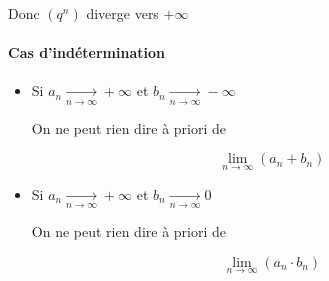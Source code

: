 \documentclass[
    11pt,
    a4paper,
    oneside,
    headinlcude, footinclude,
    twoside,
]{report}
\begin{document}
Donc $(q^{n})$ diverge vers $+ \infty$

\paragraph{Cas d'indétermination}

\begin{itemize}
\item Si $a_{n} \xrightarrow[n \to \infty]{} + \infty$ et $b_{n}
\xrightarrow[n \to \infty]{} - \infty$

On ne peut rien dire à priori de 

$$ \lim_{n \to \infty} (a_{n} + b_{n})$$

\item Si  $a_{n} \xrightarrow[n \to \infty]{} + \infty$ et $b_{n}
\xrightarrow[n \to \infty]{} 0$

On ne peut rien dire à priori de 

$$ \lim_{n \to \infty} (a_{n} \cdot b_{n})$$
\end{itemize}
\end{document}
